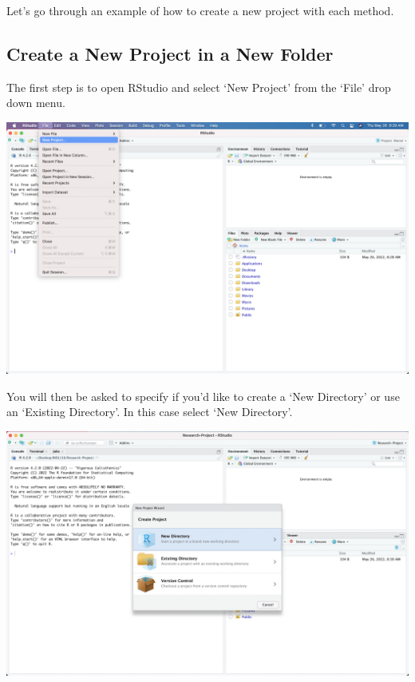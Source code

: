 \documentclass[
]{book}
\begin{document}
Let's go through an example of how to create a new project with each method.

\hypertarget{create-a-new-project-in-a-new-folder}{%
\subsection*{Create a New Project in a New Folder}\label{create-a-new-project-in-a-new-folder}}

The first step is to open RStudio and select `New Project' from the `File' drop down menu.

\includegraphics{images/D_new-project-1.png}

You will then be asked to specify if you'd like to create a `New Directory' or use an `Existing Directory'. In this case select `New Directory'.

\includegraphics{images/D_new-project-in-new-folder-2.png}
\end{document}
